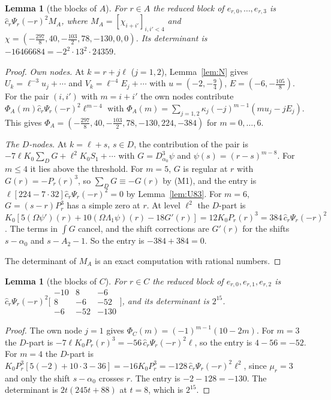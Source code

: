 \documentclass[11pt]{amsart}
\newtheorem{lemma}[theorem]{Lemma}
\theoremstyle{definition}
\theoremstyle{remark}
\numberwithin{equation}{section}
\begin{document}
\begin{lemma}[the blocks of $A$]\label{lem:blockA}
For $r\in A$ the reduced block of $e_{r,0},\dots,e_{r,3}$ is $\hat c_r\Psi_r(-r)^2M_A$, where
$M_A=[\chi_{i+i'}]_{i,i'<4}$ and $\chi=(-\frac{297}8,40,-\frac{103}2,78,-130,0,0)$. Its determinant is $-16466684=-2^2\cdot13^2\cdot24359$.
\end{lemma}

\begin{proof}
\emph{Own nodes.} At $k=r+j\ell$ ($j=1,2$), Lemma~\ref{lem:N} gives $U_k=\ell^{-3}u_j+\cdots$ and $V_k=\ell^{-4}E_j+\cdots$ with
$u=(-2,-\frac94)$, $E=(-6,-\frac{105}8)$. For the pair $(i,i')$ with $m=i+i'$ the own nodes contribute
$\Phi_A(m)\hat c_r\Psi_r(-r)^2\ell^{m-4}$ with
$\Phi_A(m)=\sum_{j=1,2}\kappa_j(-j)^{m-1}(mu_j-jE_j)$. This gives $\Phi_A=(-\frac{297}8,40,-\frac{103}2,78,-130,224,-384)$ for $m=0,\dots,6$.

\emph{The $D$-nodes.} At $k=\ell+s$, $s\in D$, the contribution of the pair is $-7\ell K_0\sum_DG+\ell^2K_0S_1+\cdots$ with
$G=D_{\alpha_0}^3\psi$ and $\psi(s)=(r-s)^{m-8}$. For $m\le4$ it lies above the threshold. For $m=5$, $G$ is regular at $r$ with $G(r)=-P_r(r)^3$, so
$\sum_DG\equiv-G(r)$ by (M1), and the entry is $\ell[224-7\cdot32]\hat c_r\Psi_r(-r)^2=0$ by Lemma~\ref{lem:U83}. For $m=6$,
$G=(s-r)P_r^3$ has a simple zero at $r$. At level $\ell^2$ the $D$-part is
$K_0[5(\Omega\psi')(r)+10(\Omega\Lambda_1\psi)(r)-18G'(r)]=12K_0P_r(r)^3=384\,\hat c_r\Psi_r(-r)^2$. The terms in $\int G$ cancel,
and the shift corrections are $G'(r)$ for the shifts $s-\alpha_0$ and $s-A_2-1$. So the entry is $-384+384=0$.

The determinant of $M_A$ is an exact computation with rational numbers.
\end{proof}

\begin{lemma}[the blocks of $C$]\label{lem:blockC}
For $r\in C$ the reduced block of $e_{r,0},e_{r,1},e_{r,2}$ is $\hat c_r\Psi_r(-r)^2\bigl[\begin{smallmatrix}-10&8&-6\\8&-6&-52\\-6&-52&-130\end{smallmatrix}\bigr]$,
and its determinant is $2^{15}$.
\end{lemma}

\begin{proof}
The own node $j=1$ gives $\Phi_C(m)=(-1)^{m-1}(10-2m)$. For $m=3$ the $D$-part is $-7\ell K_0P_r(r)^3=-56\,\hat c_r\Psi_r(-r)^2\ell$, so the entry is $4-56=-52$.
For $m=4$ the $D$-part is $K_0P_r^3[5(-2)+10\cdot3-36]=-16K_0P_r^3=-128\,\hat c_r\Psi_r(-r)^2\ell^2$, since $\mu_r=3$ and only the
shift $s-\alpha_0$ crosses $r$. The entry is $-2-128=-130$. The determinant is $2t(245t+88)$ at $t=8$, which is $2^{15}$.
\end{proof}
\end{document}
